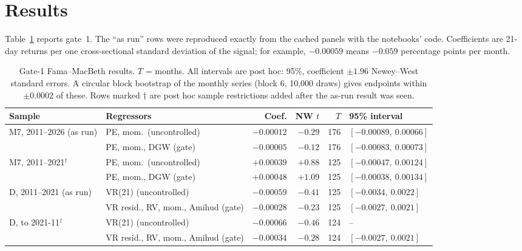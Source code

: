 \documentclass[11pt]{article}
\begin{document}
\section{Results}
\label{sec:results}

Table~\ref{tab:fm} reports gate~1. The ``as run'' rows were reproduced exactly from the
cached panels with the notebooks' code. Coefficients are 21-day returns per one
cross-sectional standard deviation of the signal; for example, $-0.00059$ means $-0.059$
percentage points per month.

\begin{table}[t]
\centering\footnotesize\setlength{\tabcolsep}{4pt}
\caption{Gate-1 Fama--MacBeth results. $T$ = months. All intervals are post hoc: 95\%,
coefficient $\pm1.96$ Newey--West standard errors. A circular block bootstrap of the
monthly series (block 6, 10,000 draws) gives endpoints within $\pm0.0002$ of these.
Rows marked $\dagger$ are post hoc sample restrictions added after the as-run result was
seen.}
\label{tab:fm}
\begin{tabular}{@{}l l r r r l@{}}
\toprule
Sample & Regressors & Coef. & NW $t$ & $T$ & 95\% interval \\
\midrule
M7, 2011--2026 (as run) & PE, mom.\ (uncontrolled) & $-0.00012$ & $-0.29$ & 176 & $[-0.00089,\ 0.00066]$ \\
                        & PE, mom., DGW (gate) & $-0.00005$ & $-0.12$ & 176 & $[-0.00083,\ 0.00073]$ \\
M7, 2011--2021$^\dagger$ & PE, mom.\ (uncontrolled) & $+0.00039$ & $+0.88$ & 125 & $[-0.00047,\ 0.00124]$ \\
                        & PE, mom., DGW (gate) & $+0.00048$ & $+1.09$ & 125 & $[-0.00038,\ 0.00134]$ \\
\addlinespace
D, 2011--2021 (as run)  & VR(21) (uncontrolled) & $-0.00059$ & $-0.41$ & 125 & $[-0.0034,\ 0.0022]$ \\
                        & VR resid., RV, mom., Amihud (gate) & $-0.00028$ & $-0.23$ & 125 & $[-0.0027,\ 0.0021]$ \\
D, to 2021-11$^\dagger$  & VR(21) (uncontrolled) & $-0.00066$ & $-0.46$ & 124 & -- \\
                        & VR resid., RV, mom., Amihud (gate) & $-0.00034$ & $-0.28$ & 124 & $[-0.0027,\ 0.0021]$ \\
\bottomrule
\end{tabular}
\end{table}
\end{document}
